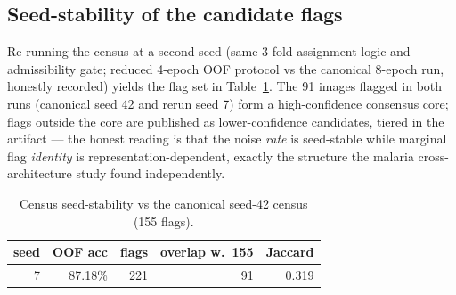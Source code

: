 \subsection{Seed-stability of the candidate flags}
Re-running the census at a second seed (same 3-fold assignment logic
and admissibility gate; reduced 4-epoch OOF protocol vs the canonical
8-epoch run, honestly recorded) yields the flag set in
Table~\ref{tab:stab}. The 91 images flagged in both runs
(canonical seed 42 and rerun seed 7) form a high-confidence consensus core; flags outside the core
are published as lower-confidence candidates, tiered in the artifact ---
the honest reading is that the noise \emph{rate} is seed-stable while
marginal flag \emph{identity} is representation-dependent, exactly the
structure the malaria cross-architecture study found independently.
\begin{table}[h]
\centering\small
\caption{Census seed-stability vs the canonical seed-42 census (155 flags).}
\label{tab:stab}
\begin{tabular}{r r r r r}
\hline
seed & OOF acc & flags & overlap w.\ 155 & Jaccard \\ \hline
7 & 87.18\% & 221 & 91 & 0.319 \\
\hline
\end{tabular}
\end{table}
